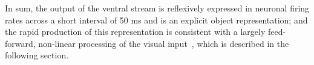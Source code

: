 


In sum, the output of the ventral stream is reflexively expressed in neuronal firing rates across a short interval of 50 ms and is an explicit object representation;
and the rapid production of this representation is consistent with a largely feed-forward, non-linear processing of the visual input~\cite{dicarlo2012does}, which is described in the following section.
